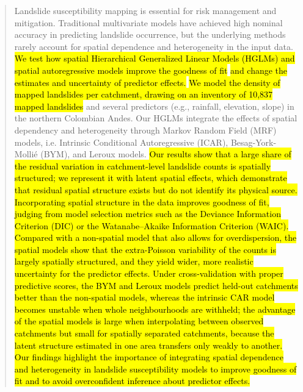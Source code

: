 \documentclass[journal abbreviation, manuscript]{copernicus}
\newcommand{\hlE}[1]{{\sethlcolor{edcyan}\hl{#1}}}
\begin{document}
\begin{abstract}
Landslide susceptibility mapping is essential for risk management and mitigation. 
Traditional multivariate models have achieved high nominal accuracy in predicting landslide occurrence, but the underlying methods rarely account for spatial dependence and heterogeneity in the input data. 
\hl{We test how spatial Hierarchical Generalized Linear Models (HGLMs) and spatial autoregressive models improve the goodness of fit} \hlE{and change the estimates and uncertainty of predictor effects.}
\hlE{We model the density of mapped landslides per catchment, drawing on an inventory of 10,837 mapped landslides} and several predictors (e.g., rainfall, elevation, slope) in the northern Colombian Andes. 
Our HGLMs integrate the effects of spatial dependency and heterogeneity through Markov Random Field (MRF) models, i.e. Intrinsic Conditional Autoregressive (ICAR), Besag-York-Mollié (BYM), and Leroux models. 
\hlE{Our results show that a large share of the residual variation in catchment-level landslide counts is spatially structured; we represent it with latent spatial effects, which demonstrate that residual spatial structure exists but do not identify its physical source.}
\hl{Incorporating spatial structure in the data improves goodness of fit, judging from model selection metrics such as the Deviance Information Criterion (DIC) or the Watanabe–Akaike Information Criterion (WAIC).} 
\hlE{Compared with a non-spatial model that also allows for overdispersion, the spatial models show that the extra-Poisson variability of the counts is largely spatially structured, and they yield wider, more realistic uncertainty for the predictor effects. Under cross-validation with proper predictive scores, the BYM and Leroux models predict held-out catchments better than the non-spatial models, whereas the intrinsic CAR model becomes unstable when whole neighbourhoods are withheld; the advantage of the spatial models is large when interpolating between observed catchments but small for spatially separated catchments, because the latent structure estimated in one area transfers only weakly to another.} 
\hl{Our findings highlight the importance of integrating spatial dependence and heterogeneity in landslide susceptibility models to improve goodness of fit and to avoid overconfident inference about predictor effects.}
\end{abstract}

\end{document}
